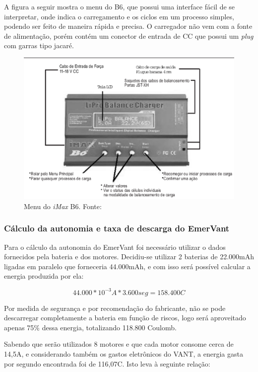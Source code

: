 A figura a seguir mostra o menu do B6, que possui uma interface fácil de se interpretar, onde indica o carregamento e os ciclos em um processo simples, podendo ser feito de maneira rápida e precisa. O carregador não vem com a fonte de alimentação, porém contém um conector de entrada de CC que possui um \textit{plug} com garras tipo jacaré.

 \begin{figure}[H]
    \centering
	\includegraphics[keepaspectratio=true,scale=0.4]{figuras/manual.eps}
    \caption{Menu do \textit{iMax} B6. Fonte: \cite{ibmax}}
\end{figure}

\subsubsection{Cálculo da autonomia e taxa de descarga do EmerVant}

Para o cálculo da autonomia do EmerVant foi necessário utilizar o dados 
fornecidos pela bateria e dos motores. Decidiu-se utilizar 2 baterias de 22.000mAh 
ligadas em paralelo que forneceria 44.000mAh, e com isso será possível calcular a 
energia produzida por ela:

\begin{equation}
 44.000 * {10} ^ {-3} A * 3.600seg = 158.400 C
\end{equation}

Por medida de segurança e por recomendação do fabricante, não se pode descarregar 
completamente a bateria em função de riscos, logo será aproveitado apenas 75\%
dessa energia, totalizando 118.800 Coulomb.

Sabendo que serão utilizados 8 motores e que cada motor consome cerca de 14,5A,
e considerando também os gastos eletrônicos do VANT, a energia gasta por segundo 
encontrada foi de 116,07C. Isto leva à seguinte relação:


